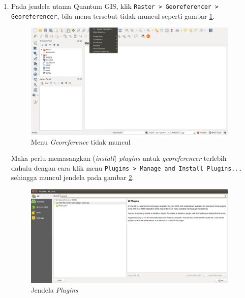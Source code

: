 \begin{enumerate}[1.]

  \item Pada jendela utama Quantum GIS, klik \texttt{Raster > Georeferencer > \- Georeferencer}, bila menu tersebut tidak muncul seperti gambar \ref{fig:georefmenunotexists}.
  
  \begin{figure}[H]
    \centering
    \includegraphics[width=1\textwidth]{./resources/018-menu-georeference-not-exists}
    \caption{Menu \textit{Georeference} tidak muncul}
    \label{fig:georefmenunotexists}
  \end{figure}
  
  Maka perlu memasangkan (\textit{install}) \textit{plugins} untuk \textit{georeferencer} terlebih dahulu dengan cara klik menu \verb|Plugins > Manage and Install Plugins...| sehingga muncul jendela pada gambar \ref{fig:pluginswin}.
  
  \begin{figure}[H]
    \centering
    \includegraphics[width=1\textwidth]{./resources/020-pluginswin}
    \caption{Jendela \textit{Plugins}}
    \label{fig:pluginswin}
  \end{figure}
  

\end{enumerate}
